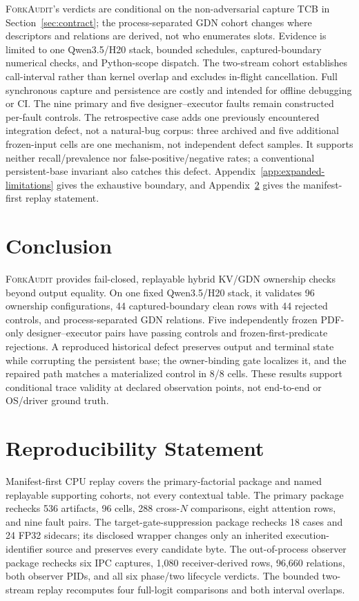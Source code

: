 \documentclass{article}
\newcommand{\method}{\textsc{ForkAudit}}
\begin{document}
\method{}'s verdicts are conditional on the non-adversarial capture TCB in
Section~\ref{sec:contract}; the process-separated GDN cohort changes where
descriptors and relations are derived, not who enumerates slots.  Evidence is
limited to one Qwen3.5/H20 stack, bounded schedules, captured-boundary
numerical checks, and Python-scope dispatch.  The two-stream cohort establishes
call-interval rather than kernel overlap and excludes in-flight cancellation.
Full synchronous capture and persistence are costly and intended for offline
debugging or CI.  The nine primary and five designer--executor faults remain
constructed per-fault controls.  The retrospective case adds one previously
encountered integration defect, not a natural-bug corpus: three archived and
five additional frozen-input cells are one mechanism, not independent defect
samples.  It supports neither recall/prevalence nor false-positive/negative
rates; a conventional persistent-base invariant also catches this defect.
Appendix~\ref{app:expanded-limitations} gives the exhaustive boundary, and
Appendix~\ref{app:reproducibility} gives the manifest-first replay statement.

\section{Conclusion}

\method{} provides fail-closed, replayable hybrid KV/GDN ownership checks
beyond output equality.  On one fixed Qwen3.5/H20 stack, it validates 96
ownership configurations, 44 captured-boundary clean rows with 44 rejected
controls, and process-separated GDN relations.  Five independently frozen
PDF-only designer--executor pairs have passing controls and frozen-first-predicate
rejections.  A reproduced historical defect preserves output and terminal state
while corrupting the persistent base; the owner-binding gate localizes it, and
the repaired path matches a materialized control in 8/8 cells.  These results
support conditional trace validity at declared observation points, not
end-to-end or OS/driver ground truth.




\appendix

\section{Reproducibility Statement}
\label{app:reproducibility}

Manifest-first CPU replay covers the primary-factorial package and named
replayable supporting cohorts, not every contextual table.  The primary package
rechecks 536 artifacts, 96 cells, 288 cross-$N$ comparisons, eight attention
rows, and nine fault pairs.  The target-gate-suppression package rechecks 18
cases and 24 FP32 sidecars; its disclosed wrapper changes only an inherited
execution-identifier source and preserves every candidate byte.  The
out-of-process observer package rechecks six IPC captures, 1,080
receiver-derived rows, 96,660 relations, both observer PIDs, and all six
phase/two lifecycle verdicts.  The bounded two-stream replay recomputes four
full-logit comparisons and both interval overlaps.
\end{document}

